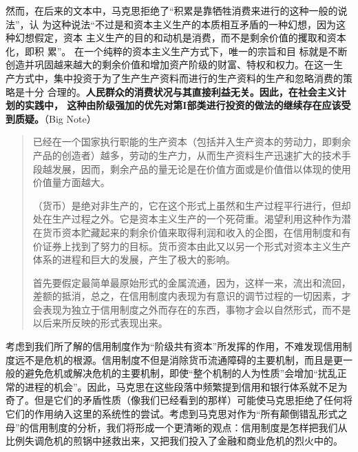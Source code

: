 然而，在后来的文本中，马克思拒绝了“积累是靠牺牲消费来进行的这种一般的说法”，认
为这种说法“不过是和资本主义生产的本质相互矛盾的一种幻想，因为这种幻想假定，资本
主义生产的目的和动机是消费，而不是剩余价值的攫取和资本化，即积
累”。 在一个纯粹的资本主义生产方式下，唯一的宗旨和目
标就是不断创造并巩固越来越大的剩余价值和增加资产阶级的财富、特权和权力。在这一生
产方式中，集中投资于为了生产生产资料而进行的生产资料的生产和忽略消费的策略是十分
合理的。\textbf{人民群众的消费状况与其直接利益无关。因此，在社会主义计划的实践中，
  这种由阶级强加的优先对第I部类进行投资的做法的继续存在应该受到质疑。}（Big
Note）

\begin{quotation}
已经在一个国家执行职能的生产资本（包括并入生产资本的劳动力，即剩余产品的创造者）越多，劳动的生产力，从而生产资料生产迅速扩大的技术手段越发展，因而，剩余产品的量无论是在价值方面或是价值借以体现的使用价值量方面越大。 

（货币）是绝对非生产的，它在这个形式上虽然和生产过程平行进行，但却处在生产过程之外。它是资本主义生产的一个死荷重。渴望利用这种作为潜在货币资本贮藏起来的剩余价值来取得利润和收入的企图，在信用制度和有价证券上找到了努力的目标。货币资本由此又以另一个形式对资本主义生产体系的进程和巨大的发展，产生了极大的影响。 

首先要假定最简单最原始形式的金属流通，因为，这样一来，流出和流回，差额的抵消，总之，在信用制度内表现为有意识的调节过程的一切因素，才会表现为独立于信用制度之外而存在的东西，事物才会以自然形式，而不是以后来所反映的形式表现出来。 

\end{quotation}

考虑到我们所了解的信用制度作为“阶级共有资本”所发挥的作用，不难发现信用制度远不是危机的根源。信用制度不但是消除货币流通障碍的主要机制，而且是更一般的避免危机或解决危机的主要机制，即使“整个机制的人为性质”会增加“扰乱正常的进程的机会”。因此，马克思在这些段落中频繁提到信用和银行体系就不足为奇了。但是它们的矛盾性质（像我们已经看到的那样）可能使马克思拒绝了任何将它们的作用纳入这里的系统性的尝试。考虑到马克思对作为“所有颠倒错乱形式之母”的信用制度的分析，我们将形成一个更清晰的观点：信用制度是怎样把我们从比例失调危机的煎锅中拯救出来，又把我们投入了金融和商业危机的烈火中的。

